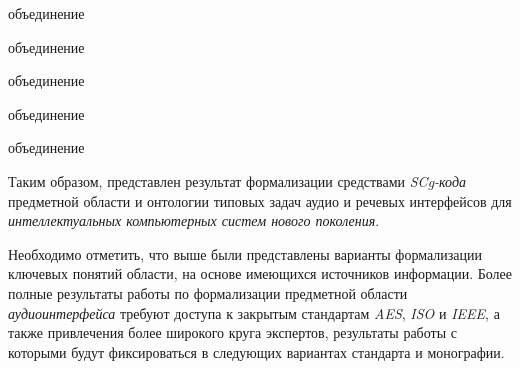 \begin{SCn}
\begin{scnindent}
    \begin{scnreltoset}{объединение}
    \begin{scnindent}
    \begin{scnreltoset}{объединение}
    \end{scnreltoset}
    \end{scnindent}
    \begin{scnreltoset}{объединение}
    \end{scnreltoset}
    \end{scnreltoset}
\end{scnindent}
\begin{scnindent}
    \begin{scnreltoset}{объединение}
    \begin{scnindent}
    \begin{scnreltoset}{объединение}
    \end{scnreltoset}
    \end{scnindent}
    \end{scnreltoset}
\end{scnindent}
\end{SCn}

Таким образом, представлен результат формализации средствами \textit{SCg-кода} предметной области и онтологии типовых задач аудио и речевых интерфейсов для \textit{интеллектуальных компьютерных систем нового поколения}.

Необходимо отметить, что выше были представлены варианты формализации ключевых понятий области, на основе имеющихся источников информации. Более полные результаты работы по формализации предметной области \textit{аудиоинтерфейса} требуют доступа к закрытым стандартам \textit{AES}, \textit{ISO} и \textit{IEEE}, а также привлечения более широкого круга экспертов, результаты работы с которыми будут фиксироваться в следующих вариантах стандарта и монографии.



